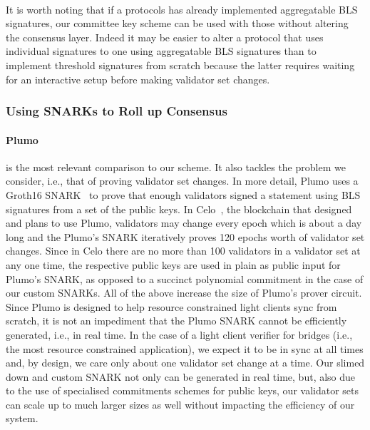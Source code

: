 \paragraph{}It is worth noting that if a protocols has already implemented aggregatable BLS signatures, our committee key scheme can be used 
with those without altering the consensus layer. Indeed it may be easier to alter a protocol that uses individual signatures to one using aggregatable 
BLS signatures than to implement threshold signatures from scratch because the latter requires waiting for an interactive setup before making validator set changes.

\subsubsection{Using SNARKs to Roll up Consensus}


\paragraph{Plumo~\cite{plumo}} is the most relevant comparison to our scheme. It also tackles the problem we consider, i.e., that of 
proving validator set changes. In more detail, Plumo uses a Groth16 SNARK~\cite{groth16} to prove that enough validators signed 
a statement using BLS signatures from a set of the public keys. In Celo~\cite{celo}, the blockchain that designed and plans to use 
Plumo, validators may change every epoch which is about a day long and the Plumo's SNARK iteratively proves 120 epochs worth of 
validator set changes. Since in Celo there are no more than 100 validators in a validator set at any one time, the respective public 
keys are used in plain as public input for Plumo's SNARK, as opposed to a succinct polynomial commitment in the case of our custom SNARKs. 
All of the above increase the size of Plumo's prover circuit. Since Plumo is designed to help resource constrained light clients sync from scratch, 
it is not an impediment that the Plumo SNARK cannot be efficiently generated, i.e., in real time. In the case of a light client verifier for bridges 
(i.e., the most resource constrained application), we expect it to be in sync at all times and, by design, we care only about one validator 
set change at a time. Our slimed down and custom SNARK not only can be generated in real time, but, also due to the use of specialised 
commitments schemes for public keys, our validator sets can scale up to much larger sizes as well without impacting the efficiency of our system. 

